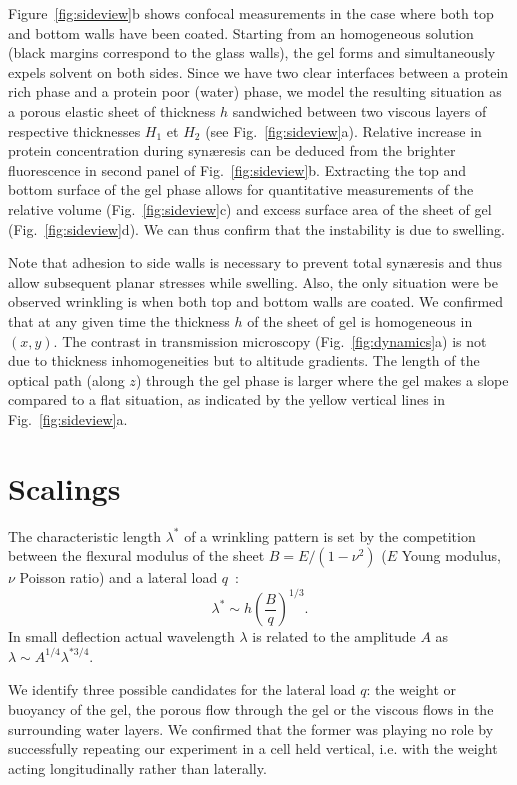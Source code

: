 \documentclass[twocolumn,superscriptaddress,showpacs,preprintnumbers,amsmath,amssymb,prl]{revtex4-1}
\begin{document}
Figure~\ref{fig:sideview}b shows confocal measurements in the case where both top and bottom walls have been coated. Starting from an homogeneous solution (black margins correspond to the glass walls), the gel forms and simultaneously expels solvent on both sides. Since we have two clear interfaces between a protein rich phase and a protein poor (water) phase, we model the resulting situation as a porous elastic sheet of thickness $h$ sandwiched between two viscous layers of respective thicknesses $H_1$ et $H_2$ (see Fig.~\ref{fig:sideview}a). Relative increase in protein concentration during syn\ae{}resis can be deduced from the brighter fluorescence in second panel of Fig.~\ref{fig:sideview}b. Extracting the top and bottom surface of the gel phase allows for quantitative measurements of the relative volume (Fig.~\ref{fig:sideview}c) and excess surface area of the sheet of gel (Fig.~\ref{fig:sideview}d). We can thus confirm that the instability is due to swelling.

Note that adhesion to side walls is necessary to prevent total syn\ae{}resis and thus allow subsequent planar stresses while swelling. Also, the only situation were be observed wrinkling is when both top and bottom walls are coated. We confirmed that at any given time the thickness $h$ of the sheet of gel is homogeneous in $(x,y)$. The contrast in transmission microscopy (Fig.~\ref{fig:dynamics}a) is not due to thickness inhomogeneities but to altitude gradients. The length of the optical path (along $z$) through the gel phase is larger where the gel makes a slope compared to a flat situation, as indicated by the yellow vertical lines in Fig.~\ref{fig:sideview}a.

\section*{Scalings}

The characteristic length $\lambda^*$ of a wrinkling pattern is set by the competition between the flexural modulus of the sheet $B=E/(1-\nu^2)$ ($E$ Young modulus, $\nu$ Poisson ratio) and a lateral load $q$~\cite{Vella2009,Kolinski2009}: 
\begin{equation}
\lambda^* \sim h \left(\frac{B}{q}\right)^{1/3}.
\label{eq:lstar}
\end{equation}
In small deflection actual wavelength $\lambda$ is related to the amplitude $A$ as $\lambda \sim A^{1/4} \lambda^{*3/4}$.

We identify three possible candidates for the lateral load $q$: the weight or buoyancy of the gel, the porous flow through the gel or the viscous flows in the surrounding water layers. We confirmed that the former was playing no role by successfully repeating our experiment in a cell held vertical, i.e. with the weight acting longitudinally rather than laterally.
\end{document}
